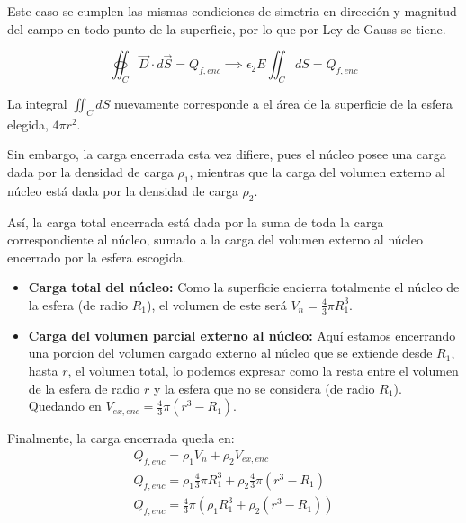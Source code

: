 \documentclass[11pt]{article}
\begin{document}
\begin{solucion}
\begin{figure}[H]
    \end{figure}

    Este caso se cumplen las mismas condiciones de simetria en dirección y magnitud del campo en todo punto de la superficie, por lo que por Ley de Gauss se tiene.

    \begin{equation}
        \oiint_C \vec{D} \cdot d\vec{S} = Q_{f, enc} \implies \epsilon_2E \iint_C dS = Q_{f, enc} \label{guia3:p1:eq2}
    \end{equation}

    La integral $\iint_C dS$ nuevamente corresponde a el área de la superficie de la esfera elegida, $4\pi r^2$.

    Sin embargo, la carga encerrada esta vez difiere, pues el núcleo posee una carga dada por la densidad de carga $\rho_1$, mientras que la carga del volumen externo al núcleo está dada por la densidad de carga $\rho_2$.

    Así, la carga total encerrada está dada por la suma de toda la carga correspondiente al núcleo, sumado a la carga del volumen externo al núcleo encerrado por la esfera escogida.

    \begin{itemize}
        \item \textbf{Carga total del núcleo:} Como la superficie encierra totalmente el núcleo de la esfera (de radio $R_1$), el volumen de este será $V_n = \frac{4}{3}\pi R_1^3$.
        \item \textbf{Carga del volumen parcial externo al núcleo:} Aquí estamos encerrando una porcion del volumen cargado externo al núcleo que se extiende desde $R_1$, hasta $r$, el volumen total, lo podemos expresar como la resta entre el volumen de la esfera de radio $r$ y la esfera que no se considera (de radio $R_1$).
              Quedando en $V_{ex, enc} = \frac{4}{3}\pi (r^3 - R_1)$.
    \end{itemize}

    Finalmente, la carga encerrada queda en:
    \begin{gather}
        Q_{f, enc} = \rho_1 V_n + \rho_2 V_{ex, enc}
        \\
        Q_{f, enc} = \rho_1 \frac{4}{3}\pi R_1^3 + \rho_2 \frac{4}{3}\pi (r^3 - R_1)
        \\
        Q_{f, enc} = \frac{4}{3}\pi \left(\rho_1  R_1^3 + \rho_2 (r^3 - R_1)\right)
    \end{gather}


\end{solucion}
\end{document}
